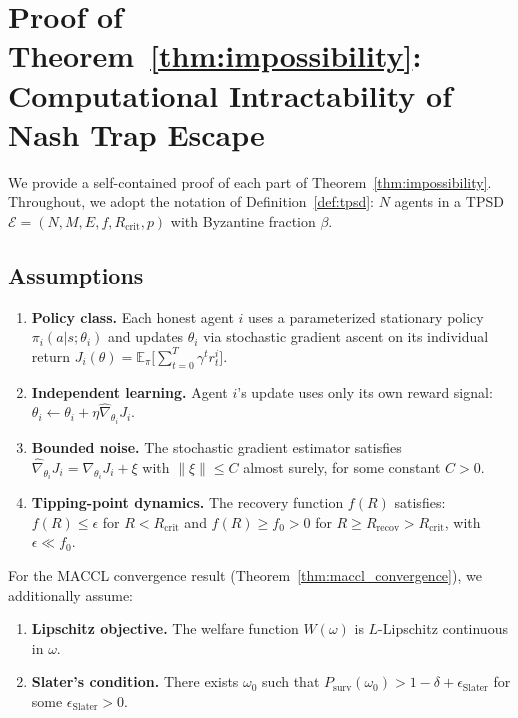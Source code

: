 
\section{Proof of Theorem~\ref{thm:impossibility}: Computational
Intractability of Nash Trap Escape}
\label{app:impossibility_proof}

We provide a self-contained proof of each part of
Theorem~\ref{thm:impossibility}. Throughout, we adopt the notation
of Definition~\ref{def:tpsd}: $N$ agents in a TPSD
$\mathcal{E} = (N, M, E, f, R_{\mathrm{crit}}, p)$ with
Byzantine fraction $\beta$.

\subsection{Assumptions}
\label{asm:assumptions}

\begin{enumerate}
  \item[\textbf{(A1)}] \textbf{Policy class.}
    Each honest agent $i$ uses a parameterized stationary policy
    $\pi_i(a | s; \theta_i)$ and updates $\theta_i$ via
    stochastic gradient ascent on its individual return
    $J_i(\theta) = \mathbb{E}_\pi \bigl[\sum_{t=0}^T \gamma^t r_t^i\bigr]$.
  \item[\textbf{(A2)}] \textbf{Independent learning.}
    Agent $i$'s update uses only its own reward signal:
    $\theta_i \leftarrow \theta_i + \eta \hat\nabla_{\theta_i} J_i$.
  \item[\textbf{(A3)}] \textbf{Bounded noise.}
    The stochastic gradient estimator satisfies
    $\hat\nabla_{\theta_i} J_i = \nabla_{\theta_i} J_i + \xi$
    with $\|\xi\| \leq C$ almost surely, for some constant $C > 0$.
  \item[\textbf{(A4)}] \textbf{Tipping-point dynamics.}
    The recovery function $f(R)$ satisfies:
    $f(R) \leq \epsilon$ for $R < R_{\mathrm{crit}}$
    and $f(R) \geq f_0 > 0$ for $R \geq R_{\mathrm{recov}} > R_{\mathrm{crit}}$,
    with $\epsilon \ll f_0$.
\end{enumerate}

For the MACCL convergence result (Theorem~\ref{thm:maccl_convergence}),
we additionally assume:
\begin{enumerate}
  \item[\textbf{(A5)}] \label{asm:lipschitz_appendix}
    \textbf{Lipschitz objective.}
    The welfare function $W(\omega)$ is $L$-Lipschitz continuous
    in $\omega$.
  \item[\textbf{(A6)}] \label{asm:slater_appendix}
    \textbf{Slater's condition.}
    There exists $\omega_0$ such that
    $P_{\mathrm{surv}}(\omega_0) > 1 - \delta + \epsilon_{\mathrm{Slater}}$
    for some $\epsilon_{\mathrm{Slater}} > 0$.
\end{enumerate}


